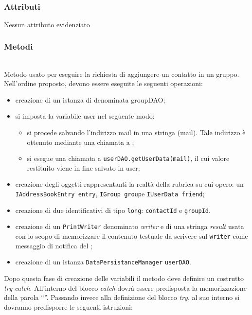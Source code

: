 \subsubsection*{Attributi}

Nessun attributo evidenziato

\subsubsection*{Metodi}

\begin{description}
	\item{}\\	
	Metodo usato per eseguire la richiesta di aggiungere un contatto in un gruppo. Nell'ordine proposto, devono essere eseguite le seguenti operazioni:
	\begin{itemize}
		\item creazione di un istanza di  denominata groupDAO;
\item si imposta la variabile user nel seguente modo:
			\begin{itemize}
				\item si procede salvando l'indirizzo mail in una stringa (mail). Tale indirizzo è ottenuto mediante una chiamata a ;
				\item si esegue una chiamata a \texttt{userDAO.getUserData(mail)}, il cui valore restituito viene in fine salvato in user;
			\end{itemize}
		\item creazione degli oggetti rappresentanti la realtà della rubrica su cui opero: un \texttt{IAddressBookEntry entry}, \texttt{IGroup group}e \texttt{IUserData friend};
		\item creazione di due identificativi di tipo \texttt{long}: \texttt{contactId} e \texttt{groupId}.
		\item creazione di un \texttt{PrintWriter} denominato \textit{writer} e di una stringa \textit{result} usata con lo scopo di memorizzare il contenuto testuale da scrivere sul \texttt{writer} come messaggio di notifica del ;
		\item creazione di un istanza \texttt{DataPersistanceManager} \texttt{userDAO}.
	\end{itemize}
	Dopo questa fase di creazione delle variabili il metodo deve definire un costrutto \textit{try-catch}. All'interno del blocco \textit{catch} dovrà essere predisposta la memorizzazione della parola ``''. Passando invece alla definizione del blocco \textit{try}, al suo interno si dovranno predisporre le seguenti istruzioni:

\end{description}
